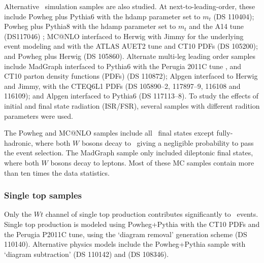 
Alternative \ttbar\ simulation samples are also studied.  At next-to-leading-order, these include {\textsc  Powheg} plus {\textsc  Pythia6}  with the hdamp parameter set to $m_{t}$ (DS 110404); {\textsc  Powheg} plus {\textsc  Pythia8} with the hdamp parameter set to $m_{t}$ and the A14 tune (DS117046) ; {\textsc  MC@NLO} \cite{mcatnlo, mcatnlo2} interfaced to {\textsc  Herwig} \cite{Herwig, Herwig1, Herwig2} with {\textsc  Jimmy} \cite{jimmy} for the underlying event modeling and with the ATLAS AUET2 \cite{auet} tune and CT10 PDFs (DS 105200); and {\textsc  Powheg} plus {\textsc  Herwig} (DS 105860). 
Alternate multi-leg leading order samples include {\textsc  MadGraph} \cite{Alwall:2011uj} interfaced to {\textsc  Pythia6} \cite{pythia6} with the Perugia 2011C tune \cite{perugia}, and CT10 parton density functions (PDFs) \cite{cttenpdf} (DS 110872); {\textsc  Alpgen} \cite{alpgen} interfaced to {\textsc  Herwig} and {\textsc  Jimmy}, with
the CTEQ6L1 PDFs \cite{CTEQ} (DS 105890--2, 117897--9, 116108 and 116109); and {\textsc  Alpgen} interfaced to {\textsc  Pythia6}
(DS 117113--8). To study the effects of initial and final state radiation (ISR/FSR), several samples with different radition parameters were used.


The {\textsc  Powheg} and {\textsc  MC@NLO} samples include all \ttbar\ final states except fully-hadronic, where both $W$ bosons decay to \qqbar\ giving a negligible probability to pass the event selection. The {\textsc  MadGraph} sample only included dileptonic final states, where both $W$ bosons decay to leptons. Most of these MC samples contain more than ten times the data statistics.

\subsubsection{Single top samples}
Only the $Wt$ channel of single top production contributes significantly to \emubb\ events. Single top production is modeled using {\textsc  Powheg+Pythia} with the CT10 PDFs and the Perugia P2011C tune, using the `diagram removal' \cite{Frixione:2008yi} generation scheme (DS 110140). Alternative physics models include the {\textsc  Powheg+Pythia} sample with `diagram subtraction' \cite{Frixione:2008yi} (DS 110142) and \mcnlohw (DS 108346).

